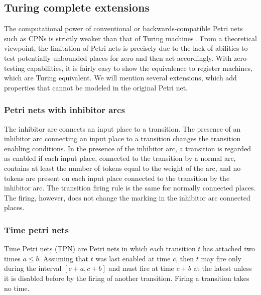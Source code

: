 

\subsection{Turing complete extensions} %
\label{sub:turing_complete_extensions}

The computational power of conventional or backwards-compatible Petri nets such as CPNs is strictly weaker than that of Turing machines \cite{Yen06PetriNets}. From a theoretical viewpoint, the limitation of Petri nets is precisely due to the lack of abilities to test potentially unbounded places for zero and then act accordingly. With zero-testing capabilities, it is fairly easy to show the equivalence to register machines, which are Turing equivalent. We will mention several extensions, which add properties that cannot be modeled in the original Petri net.

\subsubsection{Petri nets with inhibitor arcs} %
\label{ssub:petri_nets_with_inhibitor_arcs}

The inhibitor arc connects an input place to a transition. The presence of an inhibitor arc connecting an input place to a transition changes the transition enabling conditions. In the presence of the inhibitor arc, a transition is regarded as enabled if each input place, connected to the transition by a normal arc, contains at least the number of tokens equal to the weight of the arc, and no tokens are present on each input place connected to the transition by the
inhibitor arc. The transition firing rule is the same for normally connected places. The firing, however, does not change the marking in the inhibitor arc connected places. 


\subsubsection{Time petri nets} %
\label{ssub:time_petri_nets}

Time Petri nets (TPN) are Petri nets in which each transition $t$ has attached two times $a\leq b$. Assuming that $t$ was last enabled at time $c$, then $t$ may fire only during the interval $[c+a, c+b]$ and must fire at time $c+b$ at the latest unless it is disabled before by the firing of another transition. Firing a transition takes no time.

